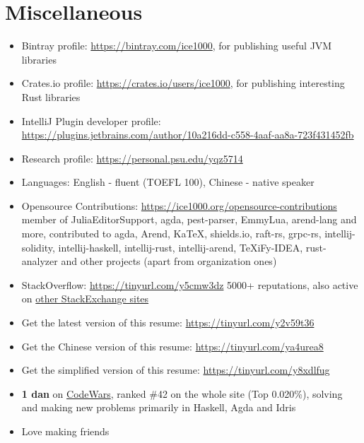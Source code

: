 \documentclass{resume}
\begin{document}
\section{Miscellaneous}
\begin{itemize}[parsep=0.25ex]
\item Bintray profile: \url{https://bintray.com/ice1000}, for publishing useful JVM libraries
\item Crates.io profile: \url{https://crates.io/users/ice1000}, for publishing interesting Rust libraries
\item IntelliJ Plugin developer profile: \url{https://plugins.jetbrains.com/author/10a216dd-c558-4aaf-aa8a-723f431452fb}
\item Research profile: \url{https://personal.psu.edu/yqz5714}
\item Languages: English - fluent (TOEFL 100), Chinese - native speaker
\item Opensource Contributions: \url{https://ice1000.org/opensource-contributions}
\\ member of \textsf{JuliaEditorSupport, agda, pest-parser, EmmyLua, arend-lang} and more,
contributed to \textsf{agda, Arend, KaTeX, shields.io, raft-rs, grpc-rs, intellij-solidity, intellij-haskell, intellij-rust, intellij-arend, TeXiFy-IDEA, rust-analyzer} and other projects
(apart from organization ones)
\item StackOverflow: \url{https://tinyurl.com/y5cmw3dz}
5000+ reputations, also active on \href{https://stackexchange.com/users/9532102}{other StackExchange sites}
\item Get the latest version of this resume: \url{https://tinyurl.com/y2v59t36}
\item Get the Chinese version of this resume: \url{https://tinyurl.com/ya4urea8}
\item Get the simplified version of this resume: \url{https://tinyurl.com/y8xdlfug}
\item \textbf{1 dan} on \href{https://www.codewars.com/users/ice1000}{CodeWars},
ranked \#42 on the whole site (Top 0.020\%),
solving and making new problems primarily in Haskell, Agda and Idris
\item Love making friends
\end{itemize}
\end{document}
